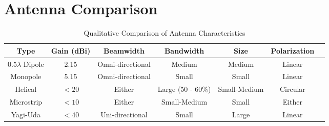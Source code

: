 



\section{Antenna Comparison}
\begin{table}[!htb]
  \centering
  \renewcommand{\arraystretch}{1.2}
  \hspace*{-0.8cm}
  \begin{tabular}{ |c|c|c|c|c|c|c| }
  \hline
  \textbf{Type} & \textbf{Gain (dBi)} & \textbf{Beamwidth} & \textbf{Bandwidth} & \textbf{Size} & \textbf{Polarization} \\ \hline
  $0.5 \lambda$ Dipole & 2.15 & Omni-directional & Medium & Medium & Linear \\ \hline
  Monopole & 5.15 & Omni-directional & Small & Small & Linear \\ \hline
  Helical & $<20$ & Either & Large (50 - 60\%) & Small-Medium & Circular \\ \hline
  Microstrip & $<10$ & Either & Small-Medium & Small & Either \\ \hline
  Yagi-Uda & $<40$ & Uni-directional & Small & Large & Linear \\ \hline
  \end{tabular}
  \caption{Qualitative Comparison of Antenna Characteristics \cite{site-antennaTheory}}
  \label{tab:antenna_characteristics}
\end{table}

